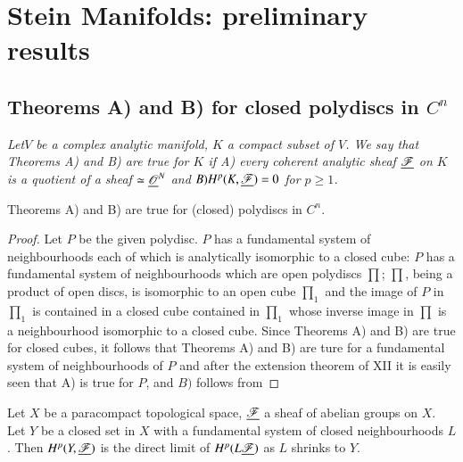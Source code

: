 \chapter{Stein Manifolds: preliminary results}\label{chap15}

\section{Theorems A) and B) for closed polydiscs in \texorpdfstring{$C^n$}{Cn}}\label{chap15:sec1}
\textit{Let\pageoriginale $V$ be a complex analytic manifold, $K$ a
  compact subset of $V$. We say that Theorems A) and B) are true for
  $K$ if A) every coherent analytic sheaf $\underline{\mathscr{F}}$ on $K$ is
  a quotient of a sheaf $\simeq \underline{\mathscr{O}}^N$ and $B) H^p (K,
 \underline{\mathscr{F}}) = 0$ for $p \geq 1$.}

\setcounter{proposition}{0}
\begin{proposition}\label{chap15:prop1}
Theorems A) and B) are true for (closed) polydiscs in $C^n$.
\end{proposition}

\begin{proof}
Let $P$ be the given polydisc. $P$ has a fundamental system of
neighbourhoods each of which is analytically isomorphic to a closed
cube: $P$ has a fundamental system of neighbourhoods which are open
polydiscs $\prod$; $\prod$, being a product of open discs, is
isomorphic to an open cube $\prod_1$ and the image of $P$ in $\prod_1$
is contained in a closed cube contained in $\prod_1$ whose inverse
image in $\prod$ is a neighbourhood isomorphic to a closed cube. Since
Theorems A) and B) are true for closed cubes, it follows that Theorems
A) and B) are ture for a fundamental system of neighbourhoods of $P$
and after the extension theorem of XII it is easily seen that A) is
true for $P$, and $B)$ follows from
\end{proof}

\setcounter{lem}{0}
\begin{lem}\label{chap15:lem1}
Let $X$ be a paracompact topological space, $\underline{\mathscr{F}}$ a sheaf
of abelian groups on $X$. Let $Y$ be a closed set in $X$ with a
fundamental system of closed neighbourhoods $L$. Then
$H^p(Y,\underline{\mathscr{F}})$ is the direct limit of $H^p
(L\underline{\mathscr{F}})$ as $L$ shrinks to $Y$. 
\end{lem}

